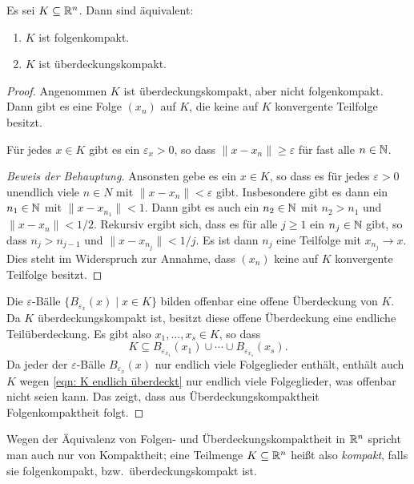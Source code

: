 \documentclass[a4paper,10pt]{article}
\begin{document}
\begin{prop}
 Es sei $K \subseteq \mathbb{R}^n$. Dann sind äquivalent:
 \begin{enumerate}
  \item
   $K$ ist folgenkompakt.
  \item
   $K$ ist überdeckungskompakt.
 \end{enumerate}
\end{prop}
\begin{proof}
 Angenommen $K$ ist überdeckungskompakt, aber nicht folgenkompakt. Dann gibt es eine Folge $(x_n)$ auf $K$, die keine auf $K$ konvergente Teilfolge besitzt.
 
 \begin{beh}
  Für jedes $x \in K$ gibt es ein $\varepsilon_x > 0$, so dass $\|x - x_n\| \geq \varepsilon$ für fast alle $n \in \mathbb{N}$.
 \end{beh}
 \begin{proof}[Beweis der Behauptung]
  Ansonsten gebe es ein $x \in K$, so dass es für jedes $\varepsilon > 0$ unendlich viele $n \in N$ mit $\|x - x_n\| < \varepsilon$ gibt. Insbesondere gibt es dann ein $n_1 \in \mathbb{N}$ mit $\|x - x_{n_1}\| < 1$. Dann gibt es auch ein $n_2 \in \mathbb{N}$ mit $n_2 > n_1$ und $\|x - x_n\| < 1/2$. Rekursiv ergibt sich, dass es für alle $j \geq 1$ ein $n_j \in \mathbb{N}$ gibt, so dass $n_j > n_{j-1}$ und $\|x - x_{n_j}\| < 1/j$. Es ist dann $n_j$ eine Teilfolge mit $x_{n_j} \to x$. Dies steht im Widerspruch zur Annahme, dass $(x_n)$ keine auf $K$ konvergente Teilfolge besitzt.
 \end{proof}
 
 Die $\varepsilon$-Bälle $\{B_{\varepsilon_x}(x) \mid x \in K\}$ bilden offenbar eine offene Überdeckung von $K$. Da $K$ überdeckungskompakt ist, besitzt diese offene Überdeckung eine endliche Teilüberdeckung. Es gibt also $x_1, \dotsc, x_s \in K$, so dass
 \begin{equation}\label{eqn: K endlich überdeckt}
  K \subseteq B_{\varepsilon_{x_1}}(x_1) \cup \dotsb \cup B_{\varepsilon_{x_s}}(x_s).
 \end{equation}
 Da jeder der $\varepsilon$-Bälle $B_{\varepsilon_x}(x)$ nur endlich viele Folgeglieder enthält, enthält auch $K$ wegen \eqref{eqn: K endlich überdeckt} nur endlich viele Folgeglieder, was offenbar nicht seien kann. Das zeigt, dass aus Überdeckungskompaktheit Folgenkompaktheit folgt.
\end{proof}


Wegen der Äquivalenz von Folgen- und Überdeckungskompaktheit in $\mathbb{R}^n$ spricht man auch nur von Kompaktheit; eine Teilmenge $K \subseteq \mathbb{R}^n$ heißt also \emph{kompakt}, falls sie folgenkompakt, bzw.\ überdeckungskompakt ist.
\end{document}
